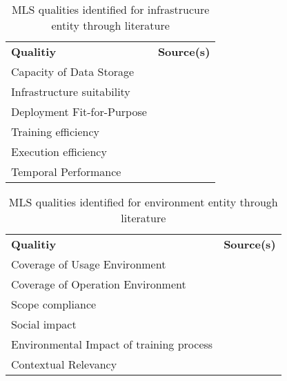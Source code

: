 \begin{table}[h]\label{tb:LiteratureQualitiesInfrastructure}
    \centering
    \begin{tabular}{p{} p{}}
        \textbf{Qualitiy} & \textbf{Source(s)} \\
        Capacity of Data Storage &~\cite{nakamichi_requirements-driven_2020} \\
        Infrastructure suitability &~\cite{siebert_construction_2021} \\
        Deployment Fit-for-Purpose &~\cite{ashmore_assuring_2021} \\
        Training efficiency &~\cite{siebert_construction_2021} \\
        Execution efficiency &~\cite{siebert_construction_2021} \\
        Temporal Performance &~\cite{nakamichi_requirements-driven_2020} \\
    \end{tabular}
    \caption{\ac{MLS} qualities identified for infrastrucure entity through literature}
\end{table}

\begin{table}[h]\label{tb:LiteratureQualitiesEnvironment}
    \centering
    \begin{tabular}{p{} p{}}
        \textbf{Qualitiy} & \textbf{Source(s)} \\
        Coverage of Usage Environment &~\cite{nakamichi_requirements-driven_2020} \\
        Coverage of Operation Environment &~\cite{nakamichi_requirements-driven_2020} \\
        Scope compliance &~\cite{siebert_construction_2021} \\
        Social impact &~\cite{siebert_construction_2021} \\
        Environmental Impact of training process &~\cite{siebert_construction_2021}\\
        Contextual Relevancy &~\cite{ashmore_assuring_2021} \\
    \end{tabular}
    \caption{\ac{MLS} qualities identified for environment entity through literature}
\end{table}

